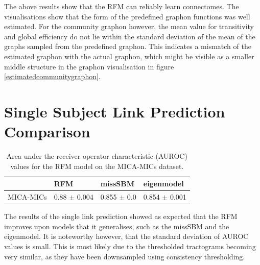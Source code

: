 \documentclass[11pt]{report} %
\begin{document}
The above results show that the RFM can reliably learn connectomes. The visualisations show that the form of the predefined graphon functions was well estimated. For the community graphon however, the mean value for transitivity and global efficiency do not lie within the standard deviation of the mean of the graphs sampled from the predefined graphon. This indicates a mismatch of the estimated graphon with the actual graphon, which might be visible as a smaller middle structure in the graphon visualisation in figure \ref{estimatedcommunitygraphon}.
\section{Single Subject Link Prediction Comparison}
\label{singlelinkprediction}
\begin{table}[h]
\caption{Area under the receiver operator characteristic (AUROC) values for the RFM model on the MICA-MICs dataset.}
\begin{tabular}{|l|l|l|l|}
\hline
 & \textbf{RFM} & \textbf{missSBM} & \textbf{eigenmodel}  \\ \hline
 MICA-MICs & 0.88 $\pm$ 0.004 & 0.855 $\pm$ 0.0 & 0.854 $\pm$ 0.001  \\ \hline
\end{tabular}
\end{table}
\noindent
The results of the single link prediction showed as expected that the RFM improves upon models that it generalises, such as the missSBM and the eigenmodel. It is noteworthy however, that the standard deviation of AUROC values is small. This is most likely due to the thresholded tractograms becoming very similar, as they have been downsampled using consistency thresholding.
\end{document}
